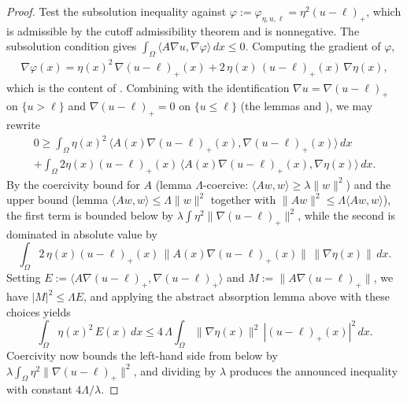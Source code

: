 \begin{proof}
\leanok
{}

Test the subsolution inequality against
$\varphi := \varphi_{\eta,u,\ell} = \eta^2 (u-\ell)_+$, which is
admissible by the cutoff admissibility theorem and is nonnegative.
The subsolution condition gives
$\int_\Omega \langle A\nabla u, \nabla \varphi\rangle \, dx \le 0$.
Computing the gradient of $\varphi$,
\begin{align*}
  \nabla \varphi(x)
   = \eta(x)^2 \, \nabla (u-\ell)_+(x)
     + 2\, \eta(x)\, (u-\ell)_+(x) \, \nabla \eta(x),
\end{align*}
which is the content of
. Combining with the
identification $\nabla u = \nabla(u - \ell)_+$ on $\{u > \ell\}$ and
$\nabla(u-\ell)_+ = 0$ on $\{u \le \ell\}$ (the lemmas
 and
), we may rewrite
\begin{multline*}
  0 \ge
   \int_\Omega \eta(x)^2 \,
     \langle A(x) \nabla(u-\ell)_+(x), \nabla(u-\ell)_+(x)\rangle \, dx \\
   + \int_\Omega 2 \eta(x) (u-\ell)_+(x)\,
     \langle A(x) \nabla(u-\ell)_+(x), \nabla \eta(x)\rangle \, dx.
\end{multline*}
By the coercivity bound for $A$ (lemma
$\Lambda$-coercive: $\langle Aw,w\rangle \ge \lambda \|w\|^2$) and the
upper bound (lemma $\langle Aw,w\rangle \le \Lambda\|w\|^2$ together
with $\|Aw\|^2 \le \Lambda \langle Aw,w\rangle$), the first term is
bounded below by $\lambda \int \eta^2 \|\nabla(u-\ell)_+\|^2$, while
the second is dominated in absolute value by
\begin{equation*}
  \int_\Omega 2\, \eta(x) (u-\ell)_+(x) \,
    \|A(x)\nabla(u-\ell)_+(x)\|\,\|\nabla \eta(x)\| \, dx.
\end{equation*}
Setting $E := \langle A\nabla(u-\ell)_+, \nabla(u-\ell)_+\rangle$ and
$M := \|A\nabla(u-\ell)_+\|$, we have $|M|^2 \le \Lambda E$, and
applying the abstract absorption lemma above with these choices
yields
\begin{equation*}
  \int_\Omega \eta(x)^2\, E(x)\, dx
   \le 4\,\Lambda \int_\Omega \|\nabla \eta(x)\|^2\,
     |(u-\ell)_+(x)|^2 \, dx.
\end{equation*}
Coercivity now bounds the left-hand side from below by
$\lambda \int_\Omega \eta^2 \|\nabla(u-\ell)_+\|^2$, and dividing by
$\lambda$ produces the announced inequality with constant
$4 \Lambda/\lambda$.
\end{proof}

